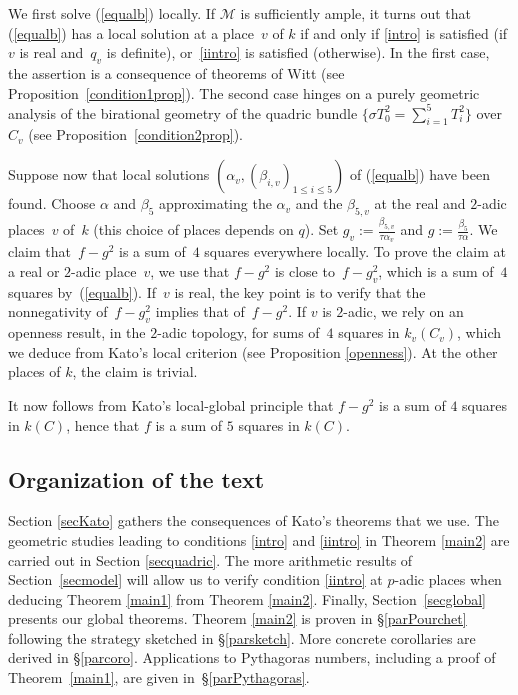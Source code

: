 \documentclass{amsart}
\theoremstyle{definition}
\theoremstyle{remark}
\numberwithin{equation}{section}
\def\cM{\mathcal{M}}
\def\cM{\mathcal{M}}
\begin{document}
\vspace{1em}

We first solve (\ref{equalb}) locally. If $\cM$ is sufficiently ample, it turns out that (\ref{equalb}) has a local solution at a place~$v$ of $k$ if and only if \ref{intro} is satisfied (if $v$ is real and~$q_v$ is definite), or~\ref{iintro} is satisfied (otherwise). In the first case, the assertion is a consequence of theorems of Witt \cite{Witt} (see Proposition~\ref{condition1prop}).
The second case hinges on a purely geometric analysis of the birational geometry of the quadric bundle $\{\sigma T_0^2=\sum_{i=1}^5 T_i^2\}$ over~$C_v$ (see Proposition~\ref{condition2prop}).

Suppose now that local solutions $(\alpha_v,(\beta_{i,v})_{1\leq i\leq 5})$ of (\ref{equalb}) have been found.
Choose $\alpha$ and $\beta_5$ approximating the $\alpha_v$ and the $\beta_{5,v}$ at the real and $2$-adic places~$v$ of~$k$ (this choice of places depends on $q$). 
Set $g_v:=\frac{\beta_{5,v}}{\tau\alpha_v}$ and $g:=\frac{\beta_5}{\tau\alpha}$.
We claim that~$f-g^2$ is a sum of~$4$ squares everywhere locally. 
To prove the claim at a real or $2$-adic place~$v$, we use that $f-g^2$ is close to~$f-g_v^2$, which is a sum of~$4$ squares by~(\ref{equalb}). If~$v$ is real, the key point is to verify that the nonnegativity of~$f-g_v^2$ implies that of~$f-g^2$. If $v$ is $2$-adic, we rely on an openness result, in the $2$-adic topology, for sums of~$4$ squares in $k_v(C_v)$, which we deduce from Kato's local criterion (see Proposition \ref{openness}).  At the other places of $k$, the claim is trivial.

It now follows from Kato's local-global principle that $f-g^2$ is a sum of $4$ squares in $k(C)$, hence that $f$ is a sum of $5$ squares in $k(C)$.


\subsection{Organization of the text}

Section \ref{secKato} gathers the consequences of Kato's theorems that we use.
The geometric studies leading to conditions \ref{intro} and \ref{iintro} in Theorem  \ref{main2} are carried out in Section \ref{secquadric}. 
The more arithmetic results of Section~\ref{secmodel} 
will allow us to verify condition \ref{iintro} at $p$-adic places when deducing Theorem \ref{main1} from Theorem \ref{main2}.
Finally, Section~\ref{secglobal} presents our global theorems. Theorem \ref{main2} is proven in \S\ref{parPourchet} following the strategy sketched in \S\ref{parsketch}. More concrete corollaries are derived in \S\ref{parcoro}. Applications to Pythagoras numbers, including a proof of Theorem~\ref{main1}, are given in~\S\ref{parPythagoras}.
\end{document}
